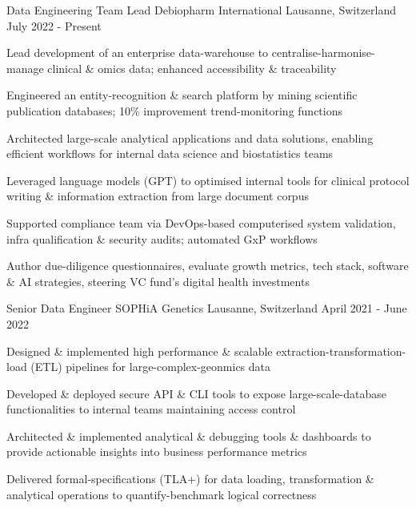 

\begin{cventries}

\vspace{-0.3cm}
 \cventry
    {Data Engineering Team Lead} %
    {Debiopharm International} %
    {Lausanne, Switzerland} %
    {July 2022 - Present} %
    {
      \begin{cvitems} %
        \item {Lead development of an enterprise data-warehouse to centralise-harmonise-manage clinical \& omics data; enhanced accessibility \& traceability}
        \item {Engineered an entity-recognition \& search platform by mining scientific publication databases; 10\% improvement trend-monitoring functions}
        \item {Architected large-scale analytical applications and data solutions, enabling efficient workflows for internal data science and biostatistics teams}
         \item {Leveraged language models (GPT) to optimised internal tools for clinical protocol writing \& information extraction from large document corpus}
        \item {Supported compliance team via DevOps-based computerised system validation, infra qualification \& security audits; automated GxP workflows}
        \item {Author due-diligence questionnaires, evaluate growth metrics, tech stack, software \& AI strategies, steering VC fund's digital health investments}
      \end{cvitems}
    }

	
 \cventry
    {Senior Data Engineer} %
    {SOPHiA Genetics} %
    {Lausanne, Switzerland} %
    {April 2021 - June 2022} %
    {
      \begin{cvitems} %
        \item {Designed \& implemented high performance \& scalable extraction-transformation-load (ETL) pipelines for large-complex-geonmics data}
        \item {Developed \& deployed secure API \& CLI tools to expose large-scale-database functionalities to internal teams maintaining access control}
        \item {Architected \& implemented analytical \& debugging tools \& dashboards to provide actionable insights into business performance metrics}
        \item {Delivered formal-specifications (TLA+) for data loading, transformation \& analytical operations to quantify-benchmark logical correctness}
      \end{cvitems}
    }


\end{cventries}
